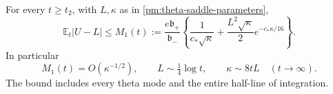 \begin{theorem}
\label{pm:theta-concentration}
For every \(t\ge t_2\), with \(L,\kappa\) as in
\eqref{pm:theta-saddle-parameters},
\begin{equation}
 \mathbb E_t|U-L|\le M_1(t):=
 \frac{e\mathfrak b_+}{\mathfrak b_-}
 \left\{\frac1{c_*\sqrt\kappa}
       +\frac{L^2\sqrt\kappa}{2}
                   e^{-c_*\kappa/16}\right\}.
 \label{pm:theta-M1-bound}
\end{equation}
In particular
\begin{equation}
 M_1(t)=O(\kappa^{-1/2}),\qquad
 L\sim\tfrac14\log t,\qquad \kappa\sim8tL
 \quad(t\to\infty).
 \label{pm:theta-concentration-asymptotics}
\end{equation}
The bound includes every theta mode and the entire half-line of
integration.
\end{theorem}

